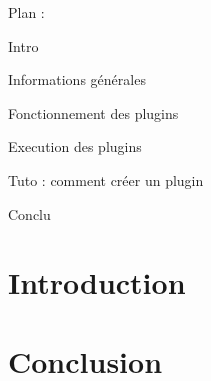 \documentclass[a4paper]{report}
\begin{document}



\tableofcontents

Plan :

	Intro

	Informations générales

	Fonctionnement des plugins

	Execution des plugins

	Tuto : comment créer un plugin

	Conclu

\chapter*{Introduction}
%


\chapter*{Conclusion}
%
\end{document}
